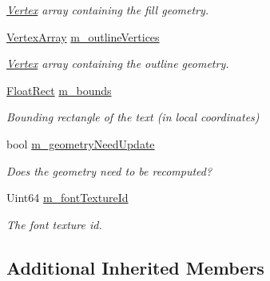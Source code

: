 \begin{DoxyCompactItemize}
\begin{DoxyCompactList}\small\item\em \mbox{\hyperlink{classsf_1_1_vertex}{Vertex}} array containing the fill geometry. \end{DoxyCompactList}\item 
\mbox{\label{classsf_1_1_text_a7e58a0f2e2be3c6988cfc7956c7f6c7c}} 
\mbox{\hyperlink{classsf_1_1_vertex_array}{Vertex\+Array}} \mbox{\hyperlink{classsf_1_1_text_a7e58a0f2e2be3c6988cfc7956c7f6c7c}{m\+\_\+outline\+Vertices}}
\begin{DoxyCompactList}\small\item\em \mbox{\hyperlink{classsf_1_1_vertex}{Vertex}} array containing the outline geometry. \end{DoxyCompactList}\item 
\mbox{\label{classsf_1_1_text_a73d20a8736e2a402859afe77f085a226}} 
\mbox{\hyperlink{classsf_1_1_rect}{Float\+Rect}} \mbox{\hyperlink{classsf_1_1_text_a73d20a8736e2a402859afe77f085a226}{m\+\_\+bounds}}
\begin{DoxyCompactList}\small\item\em Bounding rectangle of the text (in local coordinates) \end{DoxyCompactList}\item 
\mbox{\label{classsf_1_1_text_a29af9fa585a8fcb7ef3cf53d0a6baf17}} 
bool \mbox{\hyperlink{classsf_1_1_text_a29af9fa585a8fcb7ef3cf53d0a6baf17}{m\+\_\+geometry\+Need\+Update}}
\begin{DoxyCompactList}\small\item\em Does the geometry need to be recomputed? \end{DoxyCompactList}\item 
\mbox{\label{classsf_1_1_text_a97c0049579b10d545118298b23f78f30}} 
Uint64 \mbox{\hyperlink{classsf_1_1_text_a97c0049579b10d545118298b23f78f30}{m\+\_\+font\+Texture\+Id}}
\begin{DoxyCompactList}\small\item\em The font texture id. \end{DoxyCompactList}\end{DoxyCompactItemize}
\subsection*{Additional Inherited Members}


